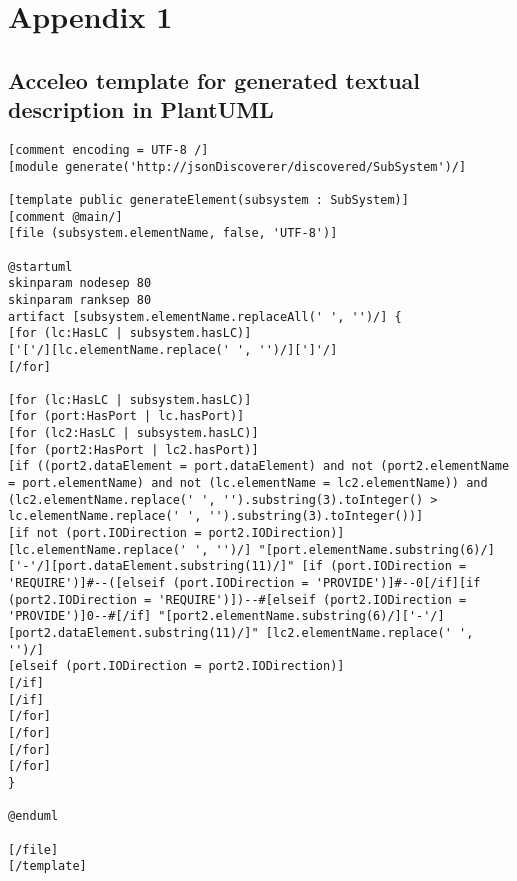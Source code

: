 \chapter{Appendix 1}
\label{app1}
\section{Acceleo template for generated textual description in PlantUML}
\label{app1:result_acceleo_template}
\begin{lstlisting}[caption=Acceleo template for generated textual description in PlantUML lanauge,label=code:acceleo_template]
[comment encoding = UTF-8 /]
[module generate('http://jsonDiscoverer/discovered/SubSystem')/]

[template public generateElement(subsystem : SubSystem)]
[comment @main/]
[file (subsystem.elementName, false, 'UTF-8')]

@startuml
skinparam nodesep 80
skinparam ranksep 80
artifact [subsystem.elementName.replaceAll(' ', '')/] {
[for (lc:HasLC | subsystem.hasLC)]
['['/][lc.elementName.replace(' ', '')/][']'/]
[/for]

[for (lc:HasLC | subsystem.hasLC)]
[for (port:HasPort | lc.hasPort)]
[for (lc2:HasLC | subsystem.hasLC)]
[for (port2:HasPort | lc2.hasPort)]
[if ((port2.dataElement = port.dataElement) and not (port2.elementName = port.elementName) and not (lc.elementName = lc2.elementName)) and (lc2.elementName.replace(' ', '').substring(3).toInteger() > lc.elementName.replace(' ', '').substring(3).toInteger())]
[if not (port.IODirection = port2.IODirection)]
[lc.elementName.replace(' ', '')/] "[port.elementName.substring(6)/]['-'/][port.dataElement.substring(11)/]" [if (port.IODirection = 'REQUIRE')]#--([elseif (port.IODirection = 'PROVIDE')]#--0[/if][if (port2.IODirection = 'REQUIRE')])--#[elseif (port2.IODirection = 'PROVIDE')]0--#[/if] "[port2.elementName.substring(6)/]['-'/][port2.dataElement.substring(11)/]" [lc2.elementName.replace(' ', '')/]
[elseif (port.IODirection = port2.IODirection)]
[/if]
[/if]
[/for]
[/for]
[/for]
[/for]
}

@enduml

[/file]
[/template]
\end{lstlisting}



